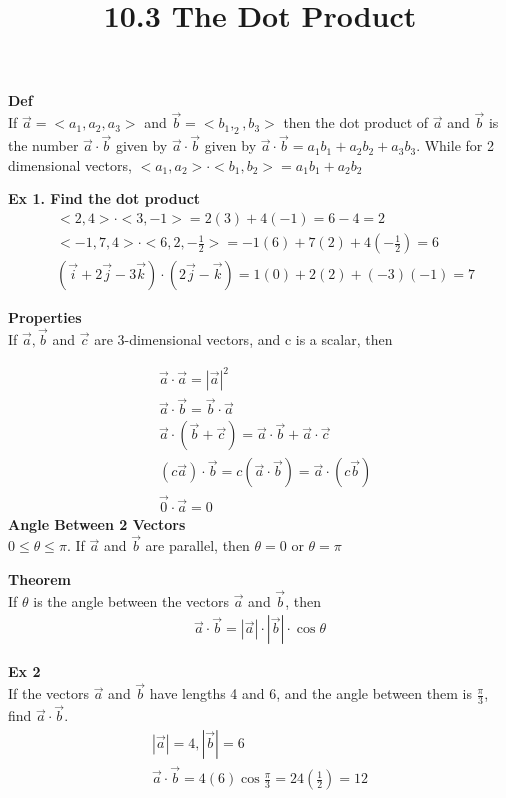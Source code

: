 \documentclass{article}
\title{10.3 The Dot Product}
\begin{document}
  \maketitle
  \textbf{Def}\\
  If $  \vec{a} = <a_1, a_2, a_3> $ and $ \vec{b} = <b_1, _2, b_3> $ then the dot product of $ \vec{a} $ and $ \vec{b} $ is the number $ \vec{a} \cdot \vec{b} $ given by $ \vec{a} \cdot \vec{b} $ given by $ \vec{a} \cdot \vec{b} = a_1b_1+a_2b_2+a_3b_3 $. While for 2 dimensional vectors, $ <a_1, a_2> \cdot <b_1, b_2>= a_1b_1+a_2b_2 $

  \textbf{Ex 1. Find the dot product}
  \[
    \begin{aligned}
      & <2, 4>\cdot <3, -1> = 2(3)+4(-1)=6-4=\boxed{2}\\
      & <-1, 7, 4> \cdot <6, 2, -\frac{1}{2}> = -1(6) + 7(2) + 4( -\frac{1}{2}) = \boxed{6}\\
      & ( \vec{i} + 2 \vec{j} - 3 \vec{k}) \cdot (2 \vec{j} - \vec{k})=1(0)+2(2)+(-3)(-1)=\boxed{7}
    \end{aligned}
  \]

  \textbf{Properties}\\
  If $ \vec{a}, \vec{b} $ and $ \vec{c} $ are 3-dimensional vectors, and c is a scalar, then

  \[
    \begin{aligned}
     & \vec{a} \cdot \vec{a} = | \vec{a} |^2\\
     & \vec{a} \cdot \vec{b} = \vec{b} \cdot \vec{a}\\
     & \vec{a} \cdot ( \vec{b} + \vec{c}) = \vec{a} \cdot \vec{b} + \vec{a} \cdot \vec{c}\\
     & (c \vec{a}) \cdot \vec{b} = c( \vec{a} \cdot \vec{b}) = \vec{a} \cdot (c \vec{b})\\
     & \vec{0} \cdot \vec{a} = 0
    \end{aligned}
  \]
  \textbf{Angle Between 2 Vectors}\\
  $ 0 \le \theta \le \pi $. If $\vec{a}$ and $\vec{b}$ are parallel, then $ \theta = 0 $ or $ \theta = \pi $

  \textbf{Theorem}\\
  If $ \theta $ is the angle between the vectors $ \vec{a} $ and $ \vec{b} $, then
  \[
    \begin{aligned}
      \vec{a} \cdot \vec{b}=| \vec{a} |\cdot | \vec{b} | \cdot \cos{\theta}
    \end{aligned}
  \]

  \textbf{Ex 2}\\
  If the vectors $ \vec{a} $ and $ \vec{b} $ have lengths 4 and 6, and the angle between them is $ \frac{\pi}{3} $, find $ \vec{a} \cdot \vec{b} $.
  \[
    \begin{aligned}
      | \vec{a} | = 4, | \vec{b} | = 6\\
      \vec{a} \cdot \vec{b} = 4(6) \cos{ \frac{\pi}{3}} = 24( \frac{1}{2}) = \boxed{12}
    \end{aligned}
  \]
\end{document}
